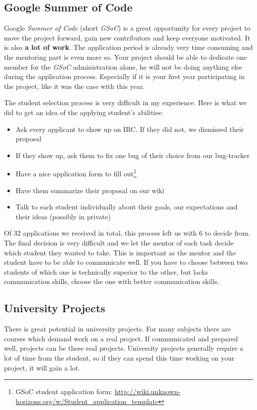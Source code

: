 \subsection{Google Summer of Code}
Google \textit{Summer of Code} (short \textit{GSoC}) is a great opportunity for every \OS{} project to move the project
forward, gain new contributors and keep everyone motivated. It is also \textbf{a lot of work}. The application period is
already very time consuming and the mentoring part is even more so. Your project should be able to dedicate one member
for the \textit{GSoC} administration alone, he will not be doing anything else during the application process. Especially
if it is your first year participating in the project, like it was the case with \UH{} this year.

The student selection process is very difficult in my experience. Here is what we did to get an idea of the applying student's
abilities:
\begin{itemize}
    \item Ask every applicant to show up on IRC. If they did not, we dismissed their proposal
    \item If they show up, ask them to fix one bug of their choice from our bug-tracker
    \item Have a nice application form to fill out\footnote{\UH{} GSoC student application form:
        \url{http://wiki.unknown-horizons.org/w/Student_application_template}}
    \item Have them summarize their proposal on our wiki
    \item Talk to each student individually about their goals, our expectations and their ideas (possibly in private)
\end{itemize}

Of 32 applications we received in total, this process left us with 6 to decide from. The final decision is very difficult
and we let the mentor of each task decide which student they wanted to take. This is important as the mentor and the
student have to be able to
communicate well. If you have to choose between two students of which one is technically superior to the other, but
lacks communication skills, choose the one with better communication skills.

\subsection{University Projects}
There is great potential in university projects. For many subjects there are courses which demand work on a real
project. If communicated and prepared well, \OS{} projects can be these real projects. University projects generally
require a lot of time from the student, so if they can spend this time working on your project, it will gain a lot.

